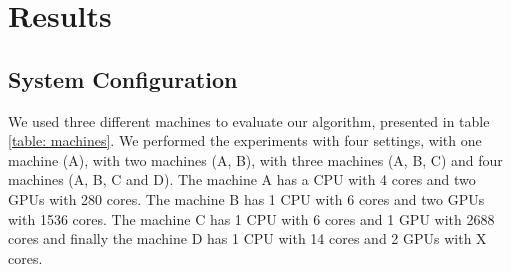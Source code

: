 \documentclass[journal]{IEEEtran}
\begin{document}

\section{Results}


\subsection{System Configuration}

We used three different machines to evaluate our algorithm, presented in table \ref{table: machines}. We performed the experiments with four settings, with one machine (A), with two machines (A, B), with three machines (A, B, C) and four machines (A, B, C and D). The machine A has a CPU with 4 cores and two GPUs with 280 cores. The machine B has 1 CPU with 6 cores and two GPUs with 1536 cores. The machine C has 1 CPU with 6 cores and 1 GPU with 2688 cores and finally the machine D has 1 CPU with 14 cores and 2 GPUs with X cores. 
\end{document}
